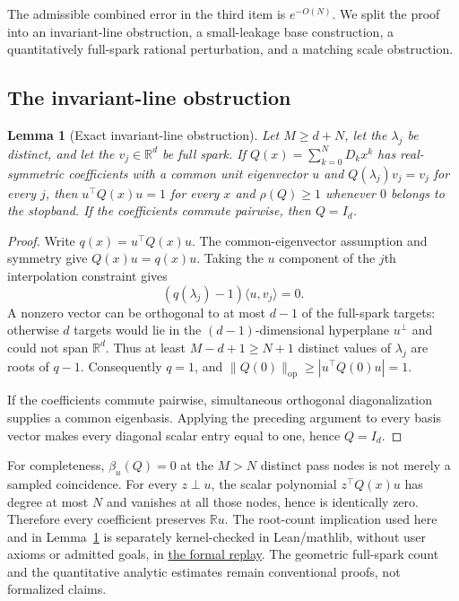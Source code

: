\documentclass[11pt]{article}
\newtheorem{lemma}[theorem]{Lemma}
\theoremstyle{remark}
\newcommand{\R}{\mathbb{R}}
\newcommand{\op}{\mathrm{op}}
\begin{document}
The admissible combined error in the third item is $e^{-O(N)}$.  We split the
proof into an invariant-line obstruction, a small-leakage base construction, a
quantitatively full-spark rational perturbation, and a matching scale
obstruction.

\subsection{The invariant-line obstruction}

\begin{lemma}[Exact invariant-line obstruction]\label{lem:commuting}
Let $M\ge d+N$, let the $\lambda_j$ be distinct, and let the $v_j\in\R^d$ be
full spark.  If $Q(x)=\sum_{k=0}^{N}D_kx^k$ has real-symmetric coefficients
with a common unit eigenvector $u$ and $Q(\lambda_j)v_j=v_j$ for every $j$,
then $u^\top Q(x)u=1$ for every $x$ and $\rho(Q)\ge1$ whenever $0$ belongs to
the stopband.  If the coefficients commute pairwise, then $Q=I_d$.
\end{lemma}

\begin{proof}
Write $q(x)=u^\top Q(x)u$.  The common-eigenvector assumption and symmetry give
$Q(x)u=q(x)u$.  Taking the $u$ component of the $j$th interpolation constraint gives
\[
  (q(\lambda_j)-1)\langle u,v_j\rangle=0.
\]
A nonzero vector can be orthogonal to at most $d-1$ of the full-spark targets:
otherwise $d$ targets would lie in the $(d-1)$-dimensional hyperplane
$u^\perp$ and could not span $\R^d$.  Thus at least
$M-d+1\ge N+1$ distinct values of $\lambda_j$ are roots of $q-1$.
Consequently $q=1$, and $\|Q(0)\|_{\op}\ge|u^\top Q(0)u|=1$.

If the coefficients commute pairwise, simultaneous orthogonal diagonalization
supplies a common eigenbasis.  Applying the preceding argument to every basis
vector makes every diagonal scalar entry equal to one, hence $Q=I_d$.
\end{proof}

For completeness, $\beta_u(Q)=0$ at the $M>N$ distinct pass nodes is not merely
a sampled coincidence.  For every $z\perp u$, the scalar polynomial
$z^\top Q(x)u$ has degree at most $N$ and vanishes at all those nodes, hence is
identically zero.  Therefore every coefficient preserves $\R u$.  The
root-count implication used here and in Lemma~\ref{lem:commuting} is separately
kernel-checked in Lean/mathlib, without user axioms or admitted goals, in
\href{https://github.com/lluiseriksson/finite-sample-spectral-certificates/blob/research/endogenous-visibility/formal/SpectralCertificates/RootCount.lean}{the formal replay}.  The geometric full-spark count and the quantitative
analytic estimates remain conventional proofs, not formalized claims.
\end{document}
